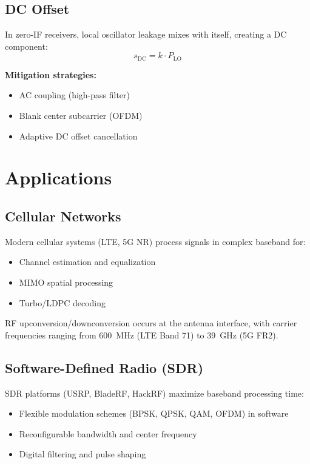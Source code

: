 \subsection{DC Offset}

In zero-IF receivers, local oscillator leakage mixes with itself, creating a DC component:
\begin{equation}
s_{\text{DC}} = k \cdot P_{\text{LO}}
\end{equation}

\textbf{Mitigation strategies:}
\begin{itemize}
\item AC coupling (high-pass filter)
\item Blank center subcarrier (OFDM)
\item Adaptive DC offset cancellation
\end{itemize}

\section{Applications}

\subsection{Cellular Networks}

Modern cellular systems (LTE, 5G NR) process signals in complex baseband for:
\begin{itemize}
\item Channel estimation and equalization
\item MIMO spatial processing
\item Turbo/LDPC decoding
\end{itemize}

RF upconversion/downconversion occurs at the antenna interface, with carrier frequencies ranging from 600~MHz (LTE Band 71) to 39~GHz (5G FR2).

\subsection{Software-Defined Radio (SDR)}

SDR platforms (USRP, BladeRF, HackRF) maximize baseband processing time:
\begin{itemize}
\item Flexible modulation schemes (BPSK, QPSK, QAM, OFDM) in software
\item Reconfigurable bandwidth and center frequency
\item Digital filtering and pulse shaping
\end{itemize}


